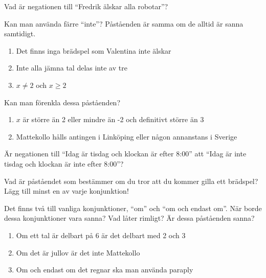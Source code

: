\begin{problem}
	Vad är negationen till ``Fredrik älskar alla robotar''?
\end{problem}

\begin{problem}
	Kan man använda färre ``inte''? Påståenden är samma om de alltid är sanna samtidigt.
	\begin{enumerate}[label=\alph*)]
		\item Det finns inga brädspel som Valentina inte älskar
		\item Inte alla jämna tal delas inte av tre
		\item \(x \neq 2\) och \(x \geq 2\) 
	\end{enumerate}
\end{problem}

\begin{problem}
	Kan man förenkla dessa påståenden?
	\begin{enumerate}[label=\alph*)]
		\item \(x\) är större än 2 eller mindre än -2 och definitivt större än 3
		\item Mattekollo hålls antingen i Linköping eller någon annanstans i Sverige
	\end{enumerate}
\end{problem}

\begin{problem}
	Är negationen till ``Idag är tisdag och klockan är efter 8:00'' att ``Idag är inte tisdag och klockan är inte efter 8:00''?
\end{problem}

\begin{problem}
	Vad är påståendet som bestämmer om du tror att du kommer gilla ett brädspel? Lägg till minst en av varje konjunktion!
\end{problem}

\begin{problem}[Extra]
	Det finns två till vanliga konjunktioner, ``om'' och ``om och endast om''. När borde dessa konjunktioner vara sanna? Vad låter rimligt? Är dessa påståenden sanna?
	\begin{enumerate}[label=\alph*)]
		\item Om ett tal är delbart på 6 är det delbart med 2 och 3
		\item Om det är jullov är det inte Mattekollo
		\item Om och endast om det regnar ska man använda paraply
	\end{enumerate}
\end{problem}

